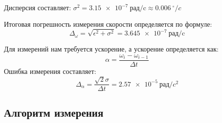 Дисперсия составляет: $\sigma^2=\SI{3,15 e-7}{\text{рад/c}} \approx \SI{0,006}{^\circ /c}$

Итоговая погрешность измерения скорости определяется по формуле:
\begin{equation}
	\Delta_{\omega}=\sqrt{\epsilon^2+\sigma^2}=\SI{3,645 e-7}{\text{рад/c}}
	\label{eq:rmse}
\end{equation}

Для измерений нам требуется ускорение, а ускорение определяется как:
\begin{equation}
	\alpha =\frac{\omega_i-\omega_{i-1}}{\Delta t}
	\label{eq:acc}
\end{equation}
Ошибка измерения составляет:
\begin{equation}
	\Delta_\alpha = \frac{\sqrt{2}\sigma}{\Delta t} = \SI{2,57 e-5}{\text{рад}/c^2}
	\label{eq:rmse_a}
\end{equation}






\subsection{Алгоритм измерения}

 
 
 
 





